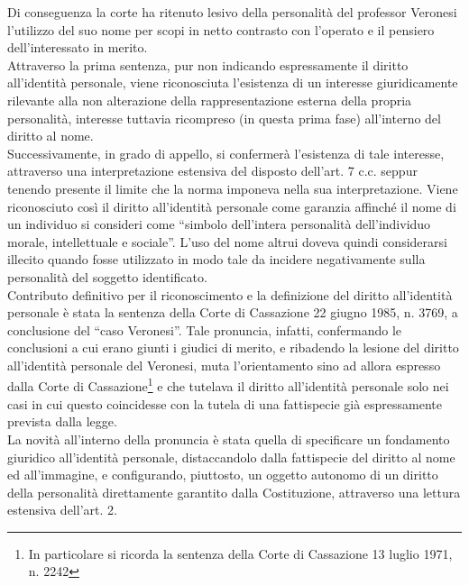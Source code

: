 Di conseguenza la corte ha ritenuto lesivo della personalità del professor Veronesi l'utilizzo del suo nome per scopi in netto contrasto con l'operato e il pensiero dell'interessato in merito. 
\\Attraverso la prima sentenza, pur non indicando espressamente il diritto all'identità personale, viene riconosciuta l'esistenza di un interesse giuridicamente rilevante alla non alterazione della rappresentazione esterna della propria personalità, interesse tuttavia ricompreso (in questa prima fase) all'interno del diritto al nome. \\Successivamente, in grado di appello, si confermerà l'esistenza di tale interesse, attraverso una interpretazione estensiva del disposto dell'art. 7 c.c. seppur tenendo presente il limite che la norma imponeva nella sua interpretazione.
Viene riconosciuto così il diritto all’identità personale come garanzia affinché il nome di un individuo si consideri come “simbolo dell'intera personalità dell'individuo morale, intellettuale e sociale”.
L'uso del nome altrui doveva quindi considerarsi illecito quando fosse utilizzato in modo tale da incidere negativamente sulla personalità del soggetto identificato. 
\\Contributo definitivo per il riconoscimento e la definizione del diritto all'identità personale è stata la sentenza della Corte di Cassazione 22  giugno  1985, n. 3769, a conclusione del “caso Veronesi”.
Tale pronuncia, infatti, confermando le conclusioni a cui erano giunti i giudici di merito, e ribadendo la lesione del diritto all’identità personale del Veronesi, muta l’orientamento sino ad allora espresso dalla Corte di Cassazione\footnote{In particolare si ricorda la sentenza della Corte di Cassazione 13 luglio 1971, n. 2242} e che tutelava il diritto all’identità personale solo nei casi in cui questo coincidesse con la tutela di una fattispecie già espressamente prevista dalla legge. 
\\La novità all'interno della pronuncia è stata quella di specificare un fondamento giuridico all’identità personale, distaccandolo dalla fattispecie del diritto al nome ed all’immagine, e configurando, piuttosto, un oggetto autonomo di un diritto della personalità direttamente garantito dalla Costituzione, attraverso una lettura estensiva dell'art. 2.
